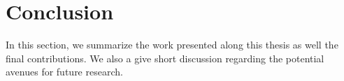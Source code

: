 \acresetall
\chapter{Conclusion}\label{chap:7}

In this section, we summarize the work presented along this thesis as well the final contributions.
We also a give short discussion regarding the potential avenues for future research.


